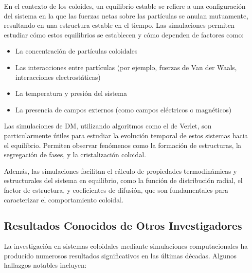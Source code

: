 \documentclass[twocolumn]{article}
\begin{document}
En el contexto de los coloides, un equilibrio estable se refiere a una configuración del sistema en la que las fuerzas netas sobre las partículas se anulan mutuamente, resultando en una estructura estable en el tiempo. Las simulaciones permiten estudiar cómo estos equilibrios se establecen y cómo dependen de factores como:

\begin{itemize}
    \item La concentración de partículas coloidales
    \item Las interacciones entre partículas (por ejemplo, fuerzas de Van der Waals, interacciones electrostáticas)
    \item La temperatura y presión del sistema
    \item La presencia de campos externos (como campos eléctricos o magnéticos)
\end{itemize}

Las simulaciones de DM, utilizando algoritmos como el de Verlet, son particularmente útiles para estudiar la evolución temporal de estos sistemas hacia el equilibrio. Permiten observar fenómenos como la formación de estructuras, la segregación de fases, y la cristalización coloidal.

Además, las simulaciones facilitan el cálculo de propiedades termodinámicas y estructurales del sistema en equilibrio, como la función de distribución radial, el factor de estructura, y coeficientes de difusión, que son fundamentales para caracterizar el comportamiento coloidal.
\subsection*{Resultados Conocidos de Otros Investigadores}
La investigación en sistemas coloidales mediante simulaciones computacionales ha producido numerosos resultados significativos en las últimas décadas. Algunos hallazgos notables incluyen:
\end{document}
